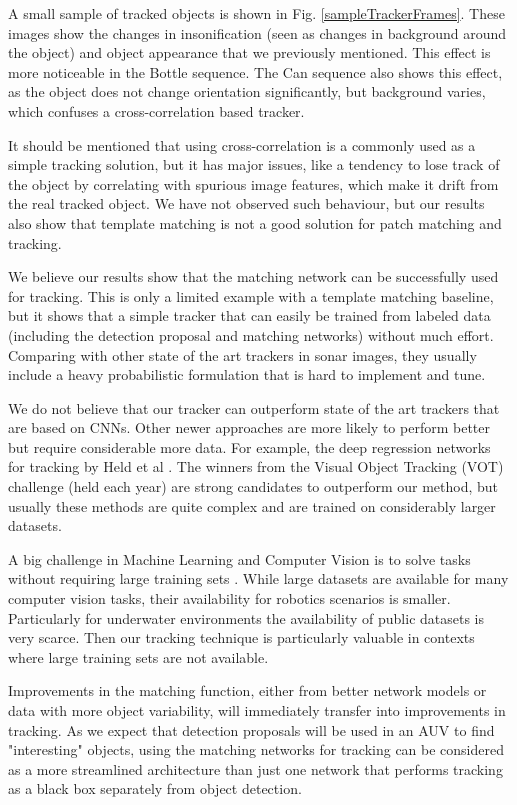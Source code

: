 A small sample of tracked objects is shown in  Fig. \ref{sampleTrackerFrames}. These images show the changes in insonification (seen as changes in background around the object) and object appearance that we previously mentioned. This effect is more noticeable in the Bottle sequence. The Can sequence also shows this effect, as the object does not change orientation significantly, but background varies, which confuses a cross-correlation based tracker.

It should be mentioned that using cross-correlation is a commonly used as a simple tracking solution, but it has major issues, like a tendency to lose track of the object by correlating with spurious image features, which make it drift from the real tracked object. We have not observed such behaviour, but our results also show that template matching is not a good solution for patch matching and tracking.

We believe our results show that the matching network can be successfully used for tracking. This is only a limited example with a template matching baseline, but it shows that a simple tracker that can easily be trained from labeled data (including the detection proposal and matching networks) without much effort. Comparing with other state of the art trackers in sonar images, they usually include a heavy probabilistic formulation that is hard to implement and tune.

We do not believe that our tracker can outperform state of the art trackers that are based on CNNs. Other newer approaches are more likely to perform better but require considerable more data. For example, the deep regression networks for tracking by Held et al \cite{held2016learning} . The winners from the Visual Object Tracking (VOT) challenge (held each year) are strong candidates to outperform our method, but usually these methods are quite complex and are trained on considerably larger datasets.

A big challenge in Machine Learning and Computer Vision is to solve tasks without requiring large training sets \cite{sun2017revisiting}. While large datasets are available for many computer vision tasks, their availability for robotics scenarios is smaller. Particularly for underwater environments the availability of public datasets is very scarce. Then our tracking technique is particularly valuable in contexts where large training sets are not available.

Improvements in the matching function, either from better network models or data with more object variability, will immediately transfer into improvements in tracking. As we expect that detection proposals will be used in an AUV to find "interesting" objects, using the matching networks for tracking can be considered as a more streamlined architecture than just one network that performs tracking as a black box separately from object detection.

